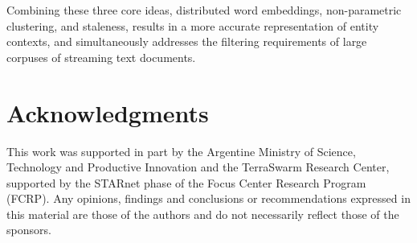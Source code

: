 \documentclass{article}
\begin{document}
Combining these three core ideas, distributed word embeddings, non-parametric clustering, and staleness, results in a more accurate representation of entity contexts, and simultaneously addresses the filtering requirements of large corpuses of streaming text documents.

\section*{Acknowledgments} 
 
This work was supported in part by the Argentine Ministry of Science, Technology and Productive Innovation and the TerraSwarm Research Center, supported by the STARnet phase of the Focus Center Research Program (FCRP). Any opinions, findings and conclusions or recommendations expressed in this material are those of the authors and do not necessarily reflect those of the sponsors.



\end{document}
